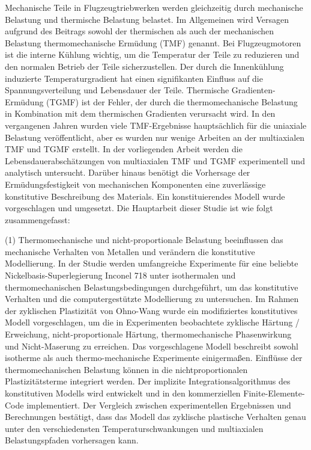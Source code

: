 \noindent
Mechanische Teile in Flugzeugtriebwerken werden gleichzeitig durch mechanische Belastung und thermische Belastung belastet. Im Allgemeinen wird Versagen aufgrund des Beitrags sowohl der thermischen als auch der mechanischen Belastung thermomechanische Ermüdung (TMF) genannt. Bei Flugzeugmotoren ist die interne Kühlung wichtig, um die Temperatur der Teile zu reduzieren und den normalen Betrieb der Teile sicherzustellen. Der durch die Innenkühlung induzierte Temperaturgradient hat einen signifikanten Einfluss auf die Spannungsverteilung und Lebensdauer der Teile. Thermische Gradienten-Ermüdung (TGMF) ist der Fehler, der durch die thermomechanische Belastung in Kombination mit dem thermischen Gradienten verursacht wird. In den vergangenen Jahren wurden viele TMF-Ergebnisse hauptsächlich für die uniaxiale Belastung veröffentlicht, aber es wurden nur wenige Arbeiten an der multiaxialen TMF und TGMF erstellt. In der vorliegenden Arbeit werden die Lebensdauerabschätzungen von multiaxialen TMF und TGMF experimentell und analytisch untersucht. Darüber hinaus benötigt die Vorhersage der Ermüdungsfestigkeit von mechanischen Komponenten eine zuverlässige konstitutive Beschreibung des Materials. Ein konstituierendes Modell wurde vorgeschlagen und umgesetzt. Die Hauptarbeit dieser Studie ist wie folgt zusammengefasst:

(1) Thermomechanische und nicht-proportionale Belastung beeinflussen das mechanische Verhalten von Metallen und verändern die konstitutive Modellierung. In der Studie werden umfangreiche Experimente für eine beliebte Nickelbasis-Superlegierung Inconel 718 unter isothermalen und thermomechanischen Belastungsbedingungen durchgeführt, um das konstitutive Verhalten und die computergestützte Modellierung zu untersuchen. Im Rahmen der zyklischen Plastizität von Ohno-Wang wurde ein modifiziertes konstitutives Modell vorgeschlagen, um die in Experimenten beobachtete zyklische Härtung / Erweichung, nicht-proportionale Härtung, thermomechanische Phasenwirkung und Nicht-Maserung zu erreichen. Das vorgeschlagene Modell beschreibt sowohl isotherme als auch thermo-mechanische Experimente einigermaßen. Einflüsse der thermomechanischen Belastung können in die nichtproportionalen Plastizitätsterme integriert werden. Der implizite Integrationsalgorithmus des konstitutiven Modells wird entwickelt und in den kommerziellen Finite-Elemente-Code implementiert. Der Vergleich zwischen experimentellen Ergebnissen und Berechnungen bestätigt, dass das Modell das zyklische plastische Verhalten genau unter den verschiedensten Temperaturschwankungen und multiaxialen Belastungspfaden vorhersagen kann.

